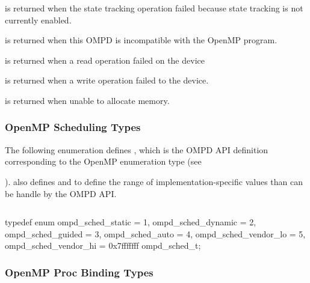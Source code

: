 \label{ompd:ompd_rc_needs_state_tracking}
 is returned when
the state tracking operation failed because state tracking is not currently enabled.

\label{ompd:ompd_rc_incompatible}
 is returned when
this OMPD is incompatible with the OpenMP program.

\label{ompd:ompd_rc_device_read_error}
 is returned when
a read operation failed on the device

\label{ompd:ompd_rc_device_write_error}
 is returned when
a write operation failed to the device.

\label{ompd:ompd_rc_nomem}
 is returned when
unable to allocate memory.

\subsubsection{OpenMP Scheduling Types}
\label{subsubsec:ompd_sched_t}

The following enumeration defines , which is the OMPD API definition 
corresponding to the OpenMP enumeration type  (see 

).
 also defines  and
 to define the range of implementation-specific 
 values than can be handle by the OMPD API.

\begin{quote}
	\begin{lstlisting}

	\end{lstlisting}
\end{quote}

\format

\begin{ccppspecific}
\begin{ompSyntax}
typedef enum {
  ompd_sched_static = 1,
  ompd_sched_dynamic = 2,
  ompd_sched_guided = 3,
  ompd_sched_auto = 4,
  ompd_sched_vendor_lo = 5,
  ompd_sched_vendor_hi = 0x7fffffff
} ompd_sched_t;
\end{ompSyntax}
\end{ccppspecific}


\subsubsection{OpenMP Proc Binding Types}
\label{subsubsec:ompd_proc_bind_t}

